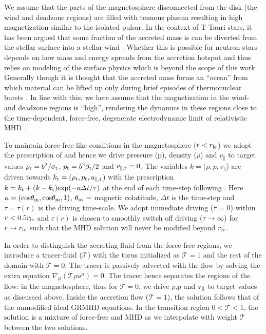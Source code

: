 \documentclass[fleqn,usenatbib]{mnras}
\begin{document}
We assume that the parts of the magnetosphere disconnected from the disk (the wind and deadzone regions) are filled with tenuous plasma resulting in high magnetization similar to the isolated pulsar.  In the context of T-Tauri stars, it has been argued that some fraction of the accreted mass is can be diverted from the stellar surface into a stellar wind \citep{MattPudritz2005}. Whether this is possible for neutron stars depends on how mass and energy spreads from the accretion hotspot and thus relies on modeling of the surface physics which is beyond the scope of this work.  Generally though it is thought that the accreted mass forms an ``ocean'' from which material can be lifted up only during brief episodes of thermonuclear bursts  \cite{GallowayKeek2021,KeekArzoumanianEtAl2018}.  In line with this, we here assume that the magnetization in the wind- and deadzone regions is ``high'', rendering the dynamics in these regions close to the time-dependent, force-free, degenerate electrodynamic limit of relativistic MHD \citep[][]{Komissarov2002}.    
 
 To maintain force-free like conditions in the magnetosphere ($r<r_{\rm lc}$) we adopt the prescription of \cite{Tchekhovskoy2013} and  hence we drive pressure (p), density ($\rho$) and $v_{\|}$ to target values $\rho_{\rm t} = b^2/\sigma_{\rm t}$, $p_{\rm t} = b^2 \beta_{\rm t}/2$ and $v_{\|,{\rm t}} = 0$. The variables $k = (\rho,p,v_{\|}$) are driven towards $k_{\rm t} = (\rho_{\rm t},p_{\rm t},u_{\|,{\rm t}}$) with the prescription $k = k_{\rm t} + (k - k_{\rm t}){\rm exp}(-\kappa\Delta t/\tau)$ at the end of each time-step following \cite{Tchekhovskoy2013}. Here ${\rm \kappa = (cos\theta_m,cos\theta_m,1)}$, ${\rm \theta_m}$ = magnetic colatitude, $\Delta t$ is the time-step and $\tau=\tau(r)$ is the driving time-scale.  We adopt immediate driving ($\tau$ = 0)  within $r< 0.5r_{\rm lc}$ and $\tau(r)$ is chosen to smoothly switch off driving ($\tau \rightarrow \infty$) for $r\to r_{\rm lc}$ such that the MHD solution will never be modified beyond $r_{\rm lc}$.  
 
 In order to distinguish the accreting fluid from the force-free regions, we introduce a tracer-fluid ($\mathcal{T}$)  with the torus initialized as $\mathcal{T} = 1$ and the rest of the domain with $\mathcal{T} = 0$. The tracer is passively advected with the flow by solving the extra equation $\nabla_{\mu}({\mathcal{T}\rho u^{\mu}}) = 0$. The tracer hence separates the regions of the flow: in the magnetosphere, thus for $\mathcal{T} = 0$, we drive $\rho$,p and ${\rm v_{\|}}$ to target values as discussed above. Inside the accretion flow ($\mathcal{T} = 1$), the solution follows that of the unmodified ideal GRMHD equations. In the transition region $0<\mathcal{T}<1$, the solution is a mixture of force-free and MHD as we interpolate with weight $\mathcal{T}$ between the two solutions.  
\end{document}
